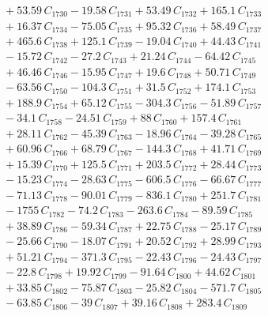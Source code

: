 \documentclass[a4paper,11pt]{article}
\begin{document}
\begin{align}
&\quad + 53.59\,C_{1730} - 19.58\,C_{1731} + 53.49\,C_{1732} + 165.1\,C_{1733} \nonumber\\
&\quad + 16.37\,C_{1734} - 75.05\,C_{1735} + 95.32\,C_{1736} + 58.49\,C_{1737} \nonumber\\
&\quad + 465.6\,C_{1738} + 125.1\,C_{1739} - 19.04\,C_{1740} + 44.43\,C_{1741} \nonumber\\
&\quad - 15.72\,C_{1742} - 27.2\,C_{1743} + 21.24\,C_{1744} - 64.42\,C_{1745} \nonumber\\
&\quad + 46.46\,C_{1746} - 15.95\,C_{1747} + 19.6\,C_{1748} + 50.71\,C_{1749} \nonumber\\
&\quad - 63.56\,C_{1750} - 104.3\,C_{1751} + 31.5\,C_{1752} + 174.1\,C_{1753} \nonumber\\
&\quad + 188.9\,C_{1754} + 65.12\,C_{1755} - 304.3\,C_{1756} - 51.89\,C_{1757} \nonumber\\
&\quad - 34.1\,C_{1758} - 24.51\,C_{1759} + 88\,C_{1760} + 157.4\,C_{1761} \nonumber\\
&\quad + 28.11\,C_{1762} - 45.39\,C_{1763} - 18.96\,C_{1764} - 39.28\,C_{1765} \nonumber\\
&\quad + 60.96\,C_{1766} + 68.79\,C_{1767} - 144.3\,C_{1768} + 41.71\,C_{1769} \nonumber\\
&\quad + 15.39\,C_{1770} + 125.5\,C_{1771} + 203.5\,C_{1772} + 28.44\,C_{1773} \nonumber\\
&\quad - 15.23\,C_{1774} - 28.63\,C_{1775} - 606.5\,C_{1776} - 66.67\,C_{1777} \nonumber\\
&\quad - 71.13\,C_{1778} - 90.01\,C_{1779} - 836.1\,C_{1780} + 251.7\,C_{1781} \nonumber\\
&\quad - 1755\,C_{1782} - 74.2\,C_{1783} - 263.6\,C_{1784} - 89.59\,C_{1785} \nonumber\\
&\quad + 38.89\,C_{1786} - 59.34\,C_{1787} + 22.75\,C_{1788} - 25.17\,C_{1789} \nonumber\\
&\quad - 25.66\,C_{1790} - 18.07\,C_{1791} + 20.52\,C_{1792} + 28.99\,C_{1793} \nonumber\\
&\quad + 51.21\,C_{1794} - 371.3\,C_{1795} - 22.43\,C_{1796} - 24.43\,C_{1797} \nonumber\\
&\quad - 22.8\,C_{1798} + 19.92\,C_{1799} - 91.64\,C_{1800} + 44.62\,C_{1801} \nonumber\\
&\quad + 33.85\,C_{1802} - 75.87\,C_{1803} - 25.82\,C_{1804} - 571.7\,C_{1805} \nonumber\\
&\quad - 63.85\,C_{1806} - 39\,C_{1807} + 39.16\,C_{1808} + 283.4\,C_{1809} \nonumber\\

\end{align}
\end{document}
